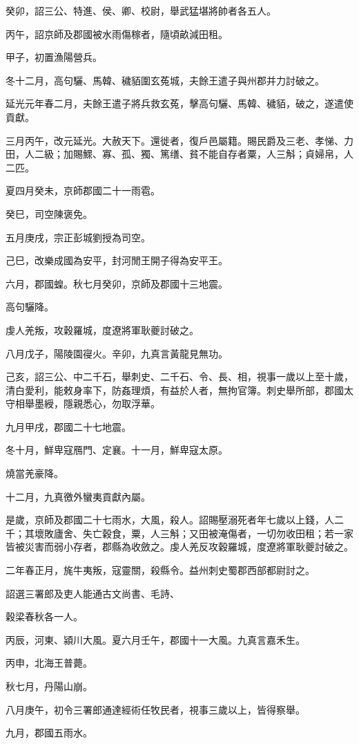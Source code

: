 \begin{pinyinscope}
癸卯，詔三公、特進、侯、卿、校尉，舉武猛堪將帥者各五人。

丙午，詔京師及郡國被水雨傷稼者，隨頃畝減田租。

甲子，初置漁陽營兵。

冬十二月，高句驪、馬韓、穢貊圍玄菟城，夫餘王遣子與州郡并力討破之。

延光元年春二月，夫餘王遣子將兵救玄菟，擊高句驪、馬韓、穢貊，破之，遂遣使貢獻。

三月丙午，改元延光。大赦天下。還徙者，復戶邑屬籍。賜民爵及三老、孝悌、力田，人二級；加賜鰥、寡、孤、獨、篤缮、貧不能自存者粟，人三斛；貞婦帛，人二匹。

夏四月癸未，京師郡國二十一雨雹。

癸巳，司空陳褒免。

五月庚戌，宗正彭城劉授為司空。

己巳，改樂成國為安平，封河閒王開子得為安平王。

六月，郡國蝗。秋七月癸卯，京師及郡國十三地震。

高句驪降。

虔人羌叛，攻穀羅城，度遼將軍耿夔討破之。

八月戊子，陽陵園寑火。辛卯，九真言黃龍見無功。

己亥，詔三公、中二千石，舉刺史、二千石、令、長、相，視事一歲以上至十歲，清白愛利，能敕身率下，防姦理煩，有益於人者，無拘官簿。刺史舉所部，郡國太守相舉墨綬，隱親悉心，勿取浮華。

九月甲戌，郡國二十七地震。

冬十月，鮮卑寇鴈門、定襄。十一月，鮮卑寇太原。

燒當羌豪降。

十二月，九真徼外蠻夷貢獻內屬。

是歲，京師及郡國二十七雨水，大風，殺人。詔賜壓溺死者年七歲以上錢，人二千；其壞敗廬舍、失亡穀食，粟，人三斛；又田被淹傷者，一切勿收田租；若一家皆被災害而弱小存者，郡縣為收斂之。虔人羌反攻穀羅城，度遼將軍耿夔討破之。

二年春正月，旄牛夷叛，寇靈關，殺縣令。益州刺史蜀郡西部都尉討之。

詔選三署郎及吏人能通古文尚書、毛詩、

穀梁春秋各一人。

丙辰，河東、潁川大風。夏六月壬午，郡國十一大風。九真言嘉禾生。

丙申，北海王普薨。

秋七月，丹陽山崩。

八月庚午，初令三署郎通達經術任牧民者，視事三歲以上，皆得察舉。

九月，郡國五雨水。


\end{pinyinscope}
